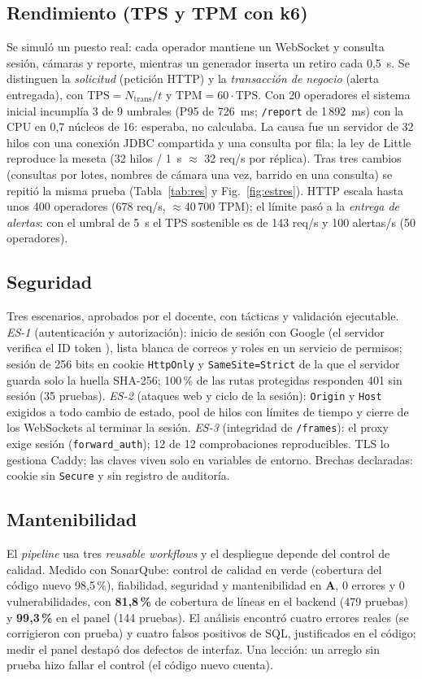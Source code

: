 \documentclass[conference]{IEEEtran}
\begin{document}
\subsection{Rendimiento (TPS y TPM con k6)}
Se simuló un puesto real: cada operador mantiene un WebSocket y consulta sesión, cámaras y reporte, mientras un generador inserta un retiro cada 0,5~s. Se distinguen la \emph{solicitud}
(petición HTTP) y la \emph{transacción de negocio} (alerta entregada), con $\mathrm{TPS}=N_{\mathrm{trans}}/t$ y $\mathrm{TPM}=60\cdot\mathrm{TPS}$. Con 20 operadores el sistema inicial
incumplía 3 de 9 umbrales (P95 de 726~ms; \texttt{/report} de 1\,892~ms) con la CPU en 0,7 núcleos de 16: esperaba, no calculaba. La causa fue un servidor de 32 hilos con una conexión JDBC
compartida y una consulta por fila; la ley de Little \cite{little} reproduce la meseta (32 hilos / 1~s $\approx$ 32 req/s por réplica). Tras tres cambios (consultas por lotes, nombres de
cámara una vez, barrido en una consulta) se repitió la misma prueba (Tabla~\ref{tab:res} y Fig.~\ref{fig:estres}). HTTP escala hasta unos 400 operadores (678 req/s, $\approx$40\,700 TPM);
el límite pasó a la \emph{entrega de alertas}: con el umbral de 5~s el TPS sostenible es de 143 req/s y 100 alertas/s (50 operadores).

\subsection{Seguridad}
Tres escenarios, aprobados por el docente, con tácticas y validación ejecutable. \emph{ES-1} (autenticación y autorización): inicio de sesión con Google (el servidor verifica el ID
token \cite{google}), lista blanca de correos y roles en un servicio de permisos; sesión de 256 bits en cookie \texttt{HttpOnly} y \texttt{SameSite=Strict} de la que el servidor guarda solo la
huella SHA-256; 100\,\% de las rutas protegidas responden 401 sin sesión (35 pruebas). \emph{ES-2} (ataques web y ciclo de la sesión): \texttt{Origin} y \texttt{Host} exigidos a todo cambio
de estado, pool de hilos con límites de tiempo y cierre de los WebSockets al terminar la sesión. \emph{ES-3} (integridad de \texttt{/frames}): el proxy exige sesión (\texttt{forward\_auth});
12 de 12 comprobaciones reproducibles. TLS lo gestiona Caddy; las claves viven solo en variables de entorno. Brechas declaradas: cookie sin \texttt{Secure} y sin registro de auditoría.

\subsection{Mantenibilidad}
El \emph{pipeline} usa tres \emph{reusable workflows} y el despliegue depende del control de calidad. Medido con SonarQube: control de calidad en verde (cobertura del código nuevo
98,5\,\%), fiabilidad, seguridad y mantenibilidad en \textbf{A}, 0 errores y 0 vulnerabilidades, con \textbf{81,8\,\%} de cobertura de líneas en el backend (479 pruebas) y \textbf{99,3\,\%} en el
panel (144 pruebas). El análisis encontró cuatro errores reales (se corrigieron con prueba) y cuatro falsos positivos de SQL, justificados en el código; medir el panel destapó dos defectos
de interfaz. Una lección: un arreglo sin prueba hizo fallar el control (el código nuevo cuenta).
\end{document}
